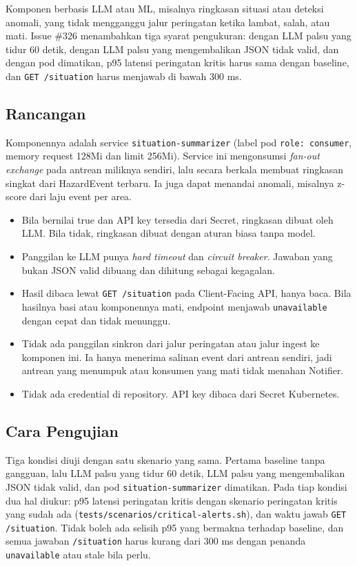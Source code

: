 Komponen berbasis LLM atau ML, misalnya ringkasan situasi atau deteksi anomali, yang tidak mengganggu jalur peringatan ketika lambat, salah, atau mati. Issue \#326 menambahkan tiga syarat pengukuran: dengan LLM palsu yang tidur 60 detik, dengan LLM palsu yang mengembalikan JSON tidak valid, dan dengan pod dimatikan, p95 latensi peringatan kritis harus sama dengan baseline, dan \texttt{GET /situation} harus menjawab di bawah 300 ms.

\subsection{Rancangan}

Komponennya adalah service \texttt{situation-summarizer} (label pod \texttt{role: consumer}, memory request 128Mi dan limit 256Mi). Service ini mengonsumsi \textit{fan-out exchange} pada antrean miliknya sendiri, lalu secara berkala membuat ringkasan singkat dari HazardEvent terbaru. Ia juga dapat menandai anomali, misalnya z-score dari laju event per area.

\begin{itemize}
\tightlist
\item
  Bila  bernilai true dan API key tersedia dari Secret, ringkasan dibuat oleh LLM. Bila tidak, ringkasan dibuat dengan aturan biasa tanpa model.
\item
  Panggilan ke LLM punya \textit{hard timeout} dan \textit{circuit breaker}. Jawaban yang bukan JSON valid dibuang dan dihitung sebagai kegagalan.
\item
  Hasil dibaca lewat \texttt{GET /situation} pada Client-Facing API, hanya baca. Bila hasilnya basi atau komponennya mati, endpoint menjawab \texttt{unavailable} dengan cepat dan tidak menunggu.
\item
  Tidak ada panggilan sinkron dari jalur peringatan atau jalur ingest ke komponen ini. Ia hanya menerima salinan event dari antrean sendiri, jadi antrean yang menumpuk atau konsumen yang mati tidak menahan Notifier.
\item
  Tidak ada credential di repository. API key dibaca dari Secret Kubernetes.
\end{itemize}

\subsection{Cara Pengujian}

Tiga kondisi diuji dengan satu skenario yang sama. Pertama baseline tanpa gangguan, lalu LLM palsu yang tidur 60 detik, LLM palsu yang mengembalikan JSON tidak valid, dan pod \texttt{situation-summarizer} dimatikan. Pada tiap kondisi dua hal diukur: p95 latensi peringatan kritis dengan skenario peringatan kritis yang sudah ada (\texttt{tests/scenarios/critical-alerts.sh}), dan waktu jawab \texttt{GET /situation}. Tidak boleh ada selisih p95 yang bermakna terhadap baseline, dan semua jawaban \texttt{/situation} harus kurang dari 300 ms dengan penanda \texttt{unavailable} atau stale bila perlu.

